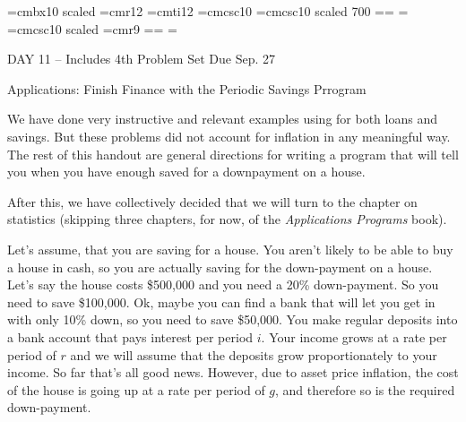 
\def\folio{\ifnum\pageno>0 \number\pageno \else
   \ifnum\pageno<0 \romannumeral-\pageno \else\fi\fi}

\font\largebf=cmbx10  scaled 
\font\largerm=cmr12
\font\largeit=cmti12
\font\tensc=cmcsc10
\font\sevensc=cmcsc10 scaled 700
\newfam\scfam \def\sc{\fam\scfam\tensc}
\textfont\scfam=\tensc \scriptfont\scfam=\sevensc
\scriptscriptfont\scfam=\sevensc
\font\largesc=cmcsc10 scaled 
\font\ninerm=cmr9
\newfam\srfam \def\sr{\fam\srfam\ninerm}
\textfont\srfam=\ninerm \scriptfont\srfam=\sevenrm
\scriptscriptfont\srfam=\fiverm




\null\vskip36pt

\centerline{\largerm DAY 11 -- Includes 4th Problem Set Due Sep. 27}
\nobreak\bigskip

\centerline{\largeit Applications: Finish Finance with the Periodic Savings Prrogram}
\nobreak\bigskip

\nobreak\bigskip

\noindent  We have done very instructive and relevant examples using for both loans and savings. But these problems did not account for inflation in any meaningful way. The rest of this handout are general directions for writing a program that will tell you when you have enough saved for a downpayment on a house.

After this, we have collectively decided that we will turn to the chapter on statistics (skipping three chapters, for now, of the {\it Applications Programs} book).

\bigskip

\nobreak\bigskip

\nobreak\bigskip

\noindent Let's assume, that you are saving for a house. You aren't likely to be able to buy a house in cash, so you are actually saving for the down-payment on a house. Let's say the house costs \$500,000 and you need a 20\% down-payment. So you need to save \$100,000. Ok, maybe you can find a bank that will let you get in with only 10\% down, so you need to save \$50,000. You make regular deposits into a bank account that pays interest per period $i$. Your income grows at a rate per period of $r$ and we will assume that the deposits grow proportionately to your income. So far that's all good news. However, due to asset price inflation, the cost of the house is going up at a rate per period of $g$, and therefore so is the required down-payment.

